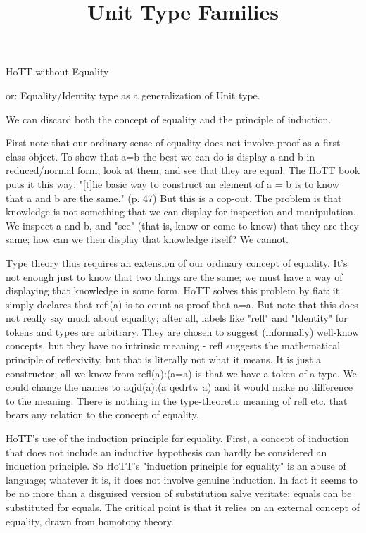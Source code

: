 \documentclass{article}
\begin{document}
\title{Unit Type Families}
\maketitle
\tableofcontents
\vfill
\large


HoTT without Equality

or: Equality/Identity type as a generalization of Unit type.

We can discard both the concept of equality and the principle of
induction.

First note that our ordinary sense of equality does not involve proof
as a first-class object.  To show that a=b the best we can do is
display a and b in reduced/normal form, look at them, and see that
they are equal.  The HoTT book puts it this way: "[t]he basic way to
construct an element of a = b is to know that a and b are the same."
(p. 47) But this is a cop-out.  The problem is that knowledge is not
something that we can display for inspection and manipulation.  We
inspect a and b, and "see" (that is, know or come to know) that they
are they same; how can we then display that knowledge itself?  We
cannot.

Type theory thus requires an extension of our ordinary concept of
equality.  It's not enough just to know that two things are the same;
we must have a way of displaying that knowledge in some form.  HoTT
solves this problem by fiat: it simply declares that refl(a) is to
count as proof that a=a.  But note that this does not really say much
about equality; after all, labels like "refl" and "Identity" for
tokens and types are arbitrary.  They are chosen to suggest
(informally) well-know concepts, but they have no intrinsic meaning -
refl suggests the mathematical principle of reflexivity, but that is
literally not what it means.  It is just a constructor; all we know
from refl(a):(a=a) is that we have a token of a type.  We could change
the names to aqjd(a):(a qedrtw a) and it would make no difference to
the meaning.  There is nothing in the type-theoretic meaning of refl
etc. that bears any relation to the concept of equality.

HoTT's use of the induction principle for equality.  First, a concept
of induction that does not include an inductive hypothesis can hardly
be considered an induction principle.  So HoTT's "induction principle
for equality" is an abuse of language; whatever it is, it does not
involve genuine induction.  In fact it seems to be no more than a
disguised version of substitution salve veritate: equals can be
substituted for equals.  The critical point is that it relies on an
external concept of equality, drawn from homotopy theory.
\end{document}
